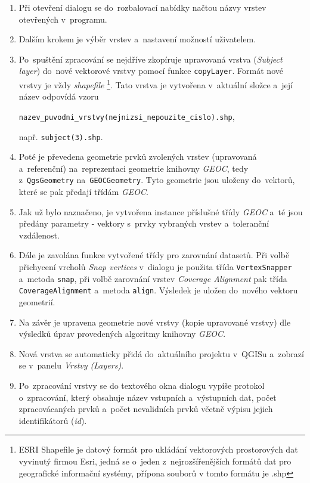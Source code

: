 \begin{enumerate}
 \item Při otevření dialogu se do~rozbalovací nabídky načtou názvy vrstev 
	otevřených v~programu.
 \item Dalším krokem je výběr vrstev a~nastavení možností uživatelem.
 \item Po~spuštění zpracování se nejdříve zkopíruje upravovaná vrstva 
	(\textit{Subject layer}) do~nové vektorové vrstvy pomocí funkce 
	\texttt{copyLayer}. Formát nové vrstvy je vždy \textit{shapefile}
	\footnote{ESRI Shapefile je datový formát pro ukládání vektorových 
	  prostorových dat  vyvinutý firmou Esri, jedná se o~jeden 
	  z~nejrozšířenějších formátů dat pro geografické informační systémy,
	  přípona souborů v tomto formátu je .shp}.
	Tato vrstva je vytvořena v~aktuální složce a~její název odpovídá vzoru 
	\begin{center}
	 \texttt{nazev\_puvodni\_vrstvy(nejnizsi\_nepouzite\_cislo).shp},
	\end{center}
	např. \texttt{subject(3).shp}.
 \item Poté je převedena geometrie prvků zvolených vrstev (upravovaná
	a~referenční) na~reprezentaci geometrie knihovny \textit{GEOC},
	tedy z~\texttt{QgsGeometry} na~\texttt{GEOCGeometry}. Tyto geometrie
	jsou uloženy do~vektorů, které se pak předají třídám \textit{GEOC}.
 \item Jak už bylo naznačeno, je vytvořena instance příslušné třídy 
	\textit{GEOC} a~té jsou předány parametry - vektory s~prvky vybraných
	vrstev a~toleranční vzdálenost. 
 \item Dále je zavolána funkce vytvořené třídy pro zarovnání datasetů. Při volbě 
	přichycení vrcholů \textit{Snap vertices} v~dialogu je použita třída 
	\texttt{VertexSnapper} a~metoda \texttt{snap}, při volbě zarovnání 
	vrstev \textit{Coverage Alignment} pak 	třída \texttt{CoverageAlignment} 
	a~metoda \texttt{align}. Výsledek je uložen do~nového vektoru geometrií.
 \item Na závěr je upravena geometrie nové vrstvy (kopie upravované vrstvy) dle
	výsledků úprav provedených algoritmy knihovny \textit{GEOC}.
 \item Nová vrstva se automaticky přidá do~aktuálního projektu v~QGISu a~zobrazí
	se v~panelu \textit{Vrstvy (Layers)}.
 \item Po~zpracování vrstvy se do textového okna dialogu vypíše protokol 
	o~zpracování, který obsahuje název vstupních a~výstupních dat, počet
	zpracovácaných prvků a~počet nevalidních prvků včetně výpisu jejich
	identifikátorů (\textit{id}).
\end{enumerate}


